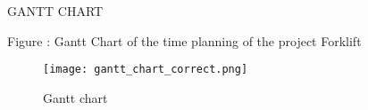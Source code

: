 \documentclass[../report.tex]{subfiles}
\begin{document}
    GANTT CHART


 Figure : Gantt Chart of the time planning of the project Forklift

 \begin{figure}[h!]
    \centering
    \texttt{[image: gantt\_chart\_correct.png]}
    \caption{Gantt chart}
 \end{figure}
  
\end{document}
